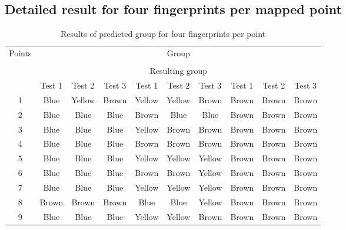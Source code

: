 \begin{landscape}
\chapter{Detailed result for four fingerprints per mapped point}\label{appendix:resultingPointsTable4p}

\begin{table}
\centering
\caption{Results of predicted group for four fingerprints per point} \label{tab:4pResults}
\begin{tabular}{c|ccc|ccc|ccc|}
\multirow{4}{*}{Points} & \multicolumn{9}{c|}{Group}                                                      \\ 
\cline{2-10}
                        & \multicolumn{3}{c|}{}    & \multicolumn{3}{c|}{}    & \multicolumn{3}{c|}{}     \\ 
\cline{2-10}
                        & \multicolumn{9}{c|}{Resulting group}                                            \\ 
\cline{2-10}
                        & Test 1 & Test 2 & Test 3 & Test 1 & Test 2 & Test 3 & Test 1 & Test 2 & Test 3  \\ 
\hline
1                       & Blue   & Yellow & Brown  & Yellow & Yellow & Brown  & Brown  & Brown  & Brown   \\
2                       & Blue   & Blue   & Blue   & Brown  & Blue   & Blue   & Brown  & Brown  & Brown   \\
3                       & Blue   & Blue   & Blue   & Yellow & Brown  & Brown  & Brown  & Brown  & Brown   \\
4                       & Blue   & Blue   & Blue   & Brown  & Brown  & Brown  & Brown  & Brown  & Brown   \\
5                       & Blue   & Blue   & Blue   & Yellow & Yellow & Yellow & Brown  & Brown  & Brown   \\
6                       & Blue   & Blue   & Blue   & Brown  & Brown  & Yellow & Brown  & Brown  & Brown   \\
7                       & Blue   & Blue   & Blue   & Yellow & Yellow & Yellow & Brown  & Brown  & Brown   \\
8                       & Brown  & Brown  & Brown  & Blue   & Blue   & Yellow & Brown  & Brown  & Brown   \\
9                       & Blue   & Blue   & Blue   & Yellow & Yellow & Brown  & Brown  & Brown  & Brown  
\end{tabular}
\end{table}
\end{landscape}
